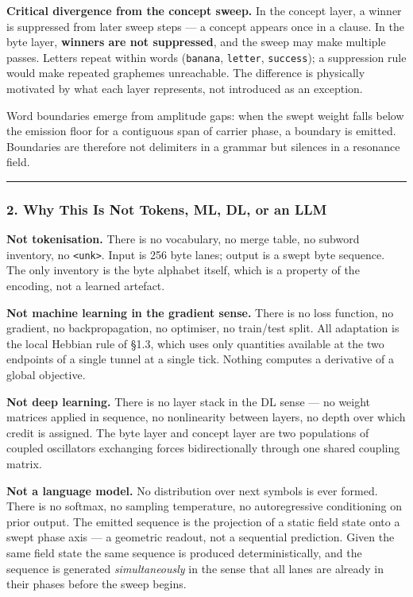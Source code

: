 \documentclass[
  11pt,
  a4paper,
]{article}
\begin{document}
\textbf{Critical divergence from the concept sweep.} In the concept
layer, a winner is suppressed from later sweep steps --- a concept
appears once in a clause. In the byte layer, \textbf{winners are not
suppressed}, and the sweep may make multiple passes. Letters repeat
within words (\texttt{banana}, \texttt{letter}, \texttt{success}); a
suppression rule would make repeated graphemes unreachable. The
difference is physically motivated by what each layer represents, not
introduced as an exception.

Word boundaries emerge from amplitude gaps: when the swept weight falls
below the emission floor for a contiguous span of carrier phase, a
boundary is emitted. Boundaries are therefore not delimiters in a
grammar but silences in a resonance field.

\begin{center}\rule{0.5\linewidth}{0.5pt}\end{center}

\subsubsection{2. Why This Is Not Tokens, ML, DL, or an
LLM}\label{why-this-is-not-tokens-ml-dl-or-an-llm}

\textbf{Not tokenisation.} There is no vocabulary, no merge table, no
subword inventory, no \texttt{\textless{}unk\textgreater{}}. Input is
256 byte lanes; output is a swept byte sequence. The only inventory is
the byte alphabet itself, which is a property of the encoding, not a
learned artefact.

\textbf{Not machine learning in the gradient sense.} There is no loss
function, no gradient, no backpropagation, no optimiser, no train/test
split. All adaptation is the local Hebbian rule of §1.3, which uses only
quantities available at the two endpoints of a single tunnel at a single
tick. Nothing computes a derivative of a global objective.

\textbf{Not deep learning.} There is no layer stack in the DL sense ---
no weight matrices applied in sequence, no nonlinearity between layers,
no depth over which credit is assigned. The byte layer and concept layer
are two populations of coupled oscillators exchanging forces
bidirectionally through one shared coupling matrix.

\textbf{Not a language model.} No distribution over next symbols is ever
formed. There is no softmax, no sampling temperature, no autoregressive
conditioning on prior output. The emitted sequence is the projection of
a static field state onto a swept phase axis --- a geometric readout,
not a sequential prediction. Given the same field state the same
sequence is produced deterministically, and the sequence is generated
\emph{simultaneously} in the sense that all lanes are already in their
phases before the sweep begins.
\end{document}

